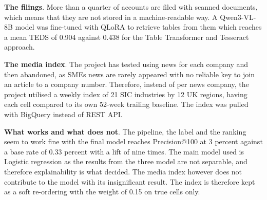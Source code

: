 \documentclass[ %
                    author={Natchalin Iwsakul \\[0.4em] Inkaphol Siriwongwattana \\[0.4em] Tanaphan Kummaraphat \\[0.6em] Patorn Srisupap},,
                supervisor={Fernando Moreno-Pino},
                    degree={MSc},
                     title={Propensity Modelling for SME Commercial Lending Using Open Public Data
},
                  subtitle={Companies House and GDELT as predictors of first-time borrowing},
                      type={},
                      year={2026}]{dissertation}
\begin{document}
\textbf{The filings}. More than a quarter of accounts are filed with scanned documents, which means that they are not stored in a machine-readable way. A Qwen3-VL-8B model was fine-tuned with QLoRA to retrieve tables from them which reaches a mean TEDS of 0.904 against 0.438 for the Table Transformer and Tesseract approach. 

\textbf{The media index}. The project has tested using news for each company and then abandoned, as SMEs news are rarely appeared with no reliable key to join an article to a company number. Therefore, instead of per news company, the project utilised a weekly index of 21 SIC industries by 12 UK regions, having each cell compared to its own 52-week trailing baseline. The index was pulled with BigQuery instead of REST API. 

\textbf{What works and what does not}. The pipeline, the label and the ranking seem to work fine with the final model reaches Precision@100 at 3 percent against a base rate of 0.33 percent with a lift of nine times. The main model used is Logistic regression as the results from the three model are not separable, and therefore explainability is what decided. The media index however does not contribute to the model with its insignificant result. The index is therefore kept as a soft re-ordering with the weight of 0.15 on true cells only.


%
%

\backmatter




\end{document}

